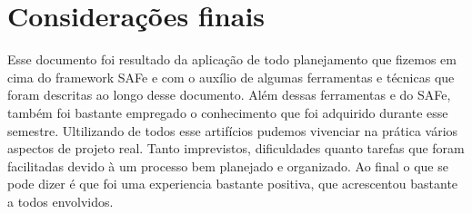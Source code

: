 \chapter{Considerações finais}

Esse documento foi resultado da aplicação de todo planejamento que fizemos em cima do framework SAFe e com o auxílio de algumas ferramentas e técnicas que foram descritas ao longo desse documento. Além dessas ferramentas e do SAFe, também foi bastante empregado o conhecimento que foi adquirido durante esse semestre.
Ultilizando de todos esse artifícios pudemos vivenciar na prática vários aspectos de projeto real. Tanto imprevistos, dificuldades quanto tarefas que foram facilitadas devido à um processo bem planejado e organizado.
Ao final o que se pode dizer é que foi uma experiencia bastante positiva, que acrescentou bastante a todos envolvidos.